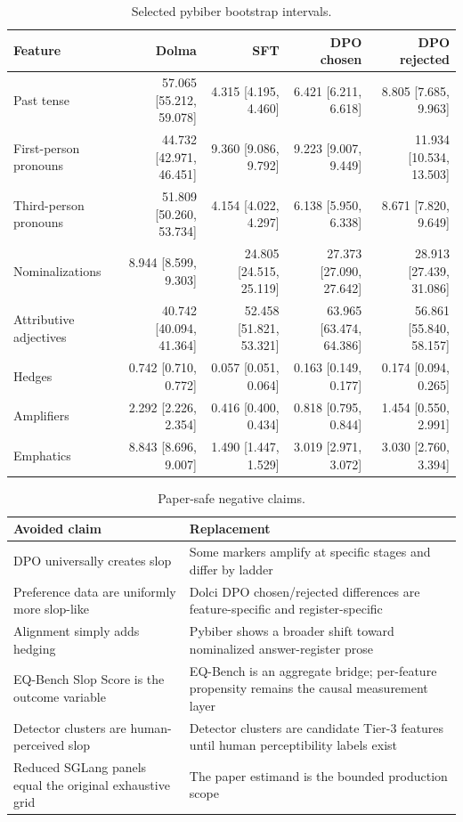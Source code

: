 \begin{table}[t]
\centering
\caption{Selected pybiber bootstrap intervals.}
\label{tab:pybiber-intervals}
\small
\begin{tabularx}{\textwidth}{@{}p{}rrrr@{}}
\toprule
Feature & Dolma & SFT & DPO chosen & DPO rejected \\
\midrule
Past tense & 57.065 [55.212, 59.078] & 4.315 [4.195, 4.460] & 6.421 [6.211, 6.618] & 8.805 [7.685, 9.963] \\
First-person pronouns & 44.732 [42.971, 46.451] & 9.360 [9.086, 9.792] & 9.223 [9.007, 9.449] & 11.934 [10.534, 13.503] \\
Third-person pronouns & 51.809 [50.260, 53.734] & 4.154 [4.022, 4.297] & 6.138 [5.950, 6.338] & 8.671 [7.820, 9.649] \\
Nominalizations & 8.944 [8.599, 9.303] & 24.805 [24.515, 25.119] & 27.373 [27.090, 27.642] & 28.913 [27.439, 31.086] \\
Attributive adjectives & 40.742 [40.094, 41.364] & 52.458 [51.821, 53.321] & 63.965 [63.474, 64.386] & 56.861 [55.840, 58.157] \\
Hedges & 0.742 [0.710, 0.772] & 0.057 [0.051, 0.064] & 0.163 [0.149, 0.177] & 0.174 [0.094, 0.265] \\
Amplifiers & 2.292 [2.226, 2.354] & 0.416 [0.400, 0.434] & 0.818 [0.795, 0.844] & 1.454 [0.550, 2.991] \\
Emphatics & 8.843 [8.696, 9.007] & 1.490 [1.447, 1.529] & 3.019 [2.971, 3.072] & 3.030 [2.760, 3.394] \\
\bottomrule
\end{tabularx}
\end{table}

\begin{table}[t]
\centering
\caption{Paper-safe negative claims.}
\label{tab:negative-claims}
\small
\begin{tabularx}{\textwidth}{@{}p{}X@{}}
\toprule
Avoided claim & Replacement \\
\midrule
DPO universally creates slop & Some markers amplify at specific stages and differ by ladder \\
Preference data are uniformly more slop-like & Dolci DPO chosen/rejected differences are feature-specific and register-specific \\
Alignment simply adds hedging & Pybiber shows a broader shift toward nominalized answer-register prose \\
EQ-Bench Slop Score is the outcome variable & EQ-Bench is an aggregate bridge; per-feature propensity remains the causal measurement layer \\
Detector clusters are human-perceived slop & Detector clusters are candidate Tier-3 features until human perceptibility labels exist \\
Reduced SGLang panels equal the original exhaustive grid & The paper estimand is the bounded production scope \\
\bottomrule
\end{tabularx}
\end{table}
